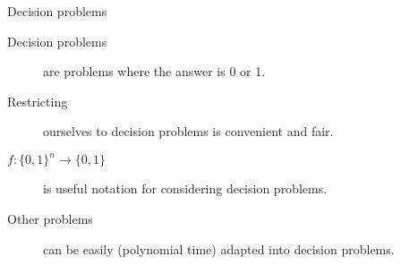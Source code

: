 \begin{frame}{Decision problems}
  \begin{description}
    \item[Decision problems] are problems where the answer is 0 or 1.
    \vspace{0.5cm}
    \item[Restricting] ourselves to decision problems is convenient and fair.
    \vspace{0.5cm}
    \item[$f:\{0,1\}^n \rightarrow \{0,1\}$] is useful notation for considering decision problems.
    \vspace{0.5cm}
    \item[Other problems] can be easily (polynomial time) adapted into decision problems.
  \end{description}
\end{frame}
